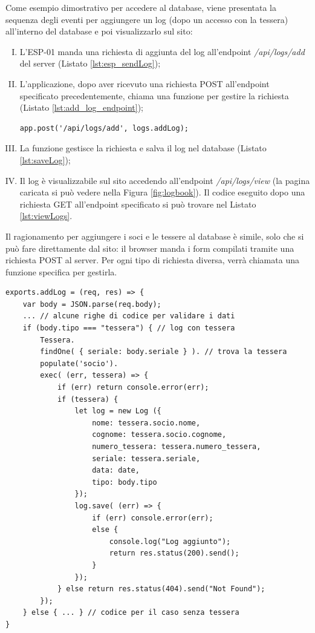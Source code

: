 \documentclass[12pt]{report}
\begin{document}
Come esempio dimostrativo per accedere al database, viene presentata la sequenza degli eventi per aggiungere un log (dopo un accesso con la tessera) all'interno del database e poi visualizzarlo sul sito:
\begin{enumerate}[(I)]
	\item L'ESP-01 manda una richiesta di aggiunta del log all'endpoint \emph{/api/logs/add} del server (Listato \ref{lst:esp_sendLog});
	\item L'applicazione, dopo aver ricevuto una richiesta POST all'endpoint specificato precedentemente, chiama una funzione per gestire la richiesta (Listato \ref{lst:add_log_endpoint});	
\begin{lstlisting}[caption={Endpoint per aggiungere i log}, label={lst:add_log_endpoint}, xleftmargin=\dimexpr-\leftmargini]
app.post('/api/logs/add', logs.addLog);
\end{lstlisting}
	\item La funzione gestisce la richiesta e salva il log nel database (Listato \ref{lst:saveLog});
	\item Il log è visualizzabile sul sito accedendo all'endpoint \emph{/api/logs/view} (la pagina caricata si può vedere nella Figura \ref{fig:logbook})$.$ Il codice eseguito dopo una richiesta GET all'endpoint specificato si può trovare nel Listato \ref{lst:viewLogs}.
	
\end{enumerate}
Il ragionamento per aggiungere i soci e le tessere al database è simile, solo che si può fare direttamente dal sito: il browser manda i form compilati tramite una richiesta POST al server. Per ogni tipo di richiesta diversa, verrà chiamata una funzione specifica per gestirla.

\pagebreak
	
\begin{lstlisting}[caption={Questa funzione aggiunge il log all'interno del database. Il corpo della richiesta POST contiene il log in formato JSON}, label={lst:saveLog}]
exports.addLog = (req, res) => {
	var body = JSON.parse(req.body);
	... // alcune righe di codice per validare i dati
	if (body.tipo === "tessera") { // log con tessera 
		Tessera.
		findOne( { seriale: body.seriale } ). // trova la tessera 
		populate('socio').
		exec( (err, tessera) => {
			if (err) return console.error(err);
			if (tessera) {
				let log = new Log ({
					nome: tessera.socio.nome,
					cognome: tessera.socio.cognome,
					numero_tessera: tessera.numero_tessera,
					seriale: tessera.seriale,
					data: date,
					tipo: body.tipo
				});	
				log.save( (err) => {
					if (err) console.error(err);
					else {
						console.log("Log aggiunto");
						return res.status(200).send();
					}
				});
			} else return res.status(404).send("Not Found");
		});
	} else { ... } // codice per il caso senza tessera
}
\end{lstlisting}
\end{document}
